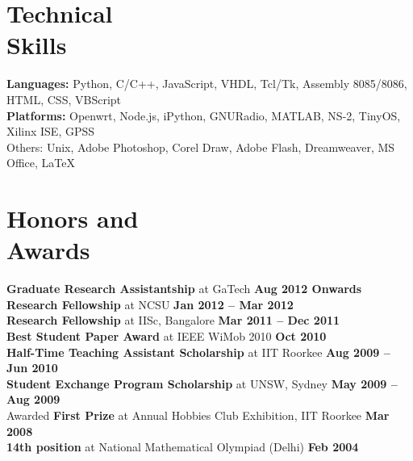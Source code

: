 \documentclass[margin,line]{resume}
\begin{document}
\begin{resume}
    \section{\mysidestyle \normalsize Technical\\Skills}
    \textbf{Languages:} Python, C/C++, JavaScript, VHDL, Tcl/Tk, Assembly 8085/8086, HTML,
    CSS, VBScript							\vspace{1mm}\\
    \textbf{Platforms:} Openwrt, Node.js, iPython, GNURadio, MATLAB, NS-2, TinyOS,
    Xilinx ISE, GPSS							\vspace{1mm}\\
    Others: Unix, Adobe Photoshop, Corel Draw, Adobe Flash, Dreamweaver, MS Office, \LaTeX

    \section{\mysidestyle \normalsize Honors and\\Awards}

    \textbf{Graduate Research Assistantship} at GaTech \hfill \textbf{Aug 2012 Onwards}\vspace{0mm}\\
    \textbf{Research Fellowship} at NCSU	\hfill \textbf{Jan 2012 -- Mar 2012}\vspace{0mm}\\
    \textbf{Research Fellowship} at IISc, Bangalore	\hfill \textbf{Mar 2011 -- Dec 2011}\vspace{0mm}\\
    \textbf{Best Student Paper Award} at IEEE WiMob 2010	 \hfill \textbf{Oct 2010}\vspace{0mm}\\
    \textbf{Half-Time Teaching Assistant Scholarship} at IIT Roorkee		 \hfill \textbf{Aug 2009 -- Jun 2010}\vspace{0mm}\\
    \textbf{Student Exchange Program Scholarship} at UNSW, Sydney	\hfill \textbf{May 2009 -- Aug 2009}\vspace{0mm}\\
    Awarded \textbf{First Prize} at Annual Hobbies Club Exhibition, IIT Roorkee	\hfill \textbf{Mar 2008}\vspace{0mm}\\
    \textbf{14th position} at National Mathematical Olympiad (Delhi)	 \hfill	\textbf{Feb 2004}


\end{resume}
\end{document}
